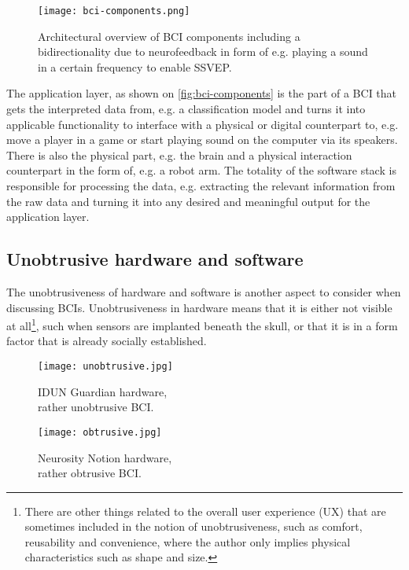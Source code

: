 \begin{figure}[ht]
  \centering
  \texttt{[image: bci-components.png]}
  \caption{Architectural overview of BCI components including a bidirectionality due to neurofeedback in form of e.g. playing a sound in a certain frequency to enable SSVEP.}
  \label{fig:bci-components}
\end{figure}

 The application layer, as shown on \autoref{fig:bci-components} is the part of a BCI that gets the interpreted data from, e.g. a classification model and turns it into applicable functionality to interface with a physical or digital counterpart to, e.g. move a player in a game or start playing sound on the computer via its speakers. There is also the physical part, e.g. the brain and a physical interaction counterpart in the form of, e.g. a robot arm. The totality of the software stack is responsible for processing the data, e.g. extracting the relevant information from the raw data and turning it into any desired and meaningful output for the application layer.

\subsection{Unobtrusive hardware and software}
\label{chapter2-unobtrusive-hardware-and-software}

The unobtrusiveness of hardware and software is another aspect to consider when discussing BCIs. Unobtrusiveness in hardware means that it is either not visible at all\footnote{There are other things related to the overall user experience (UX) that are sometimes included in the notion of unobtrusiveness, such as comfort, reusability and convenience, where the author only implies physical characteristics such as shape and size.}, such when sensors are implanted beneath the skull, or that it is in a form factor that is already socially established.

\begin{figure}[!ht]
  \texttt{[image: unobtrusive.jpg]}
  \caption{IDUN Guardian hardware, \\ rather unobtrusive BCI.}
  \label{fig:unobstrusive-hardware}
  \endminipage\hfill
  \texttt{[image: obtrusive.jpg]}
  \caption{Neurosity Notion hardware, \\ rather obtrusive BCI.}
  \label{fig:obstrusive-hardware}
  \endminipage\hfill
\end{figure}


